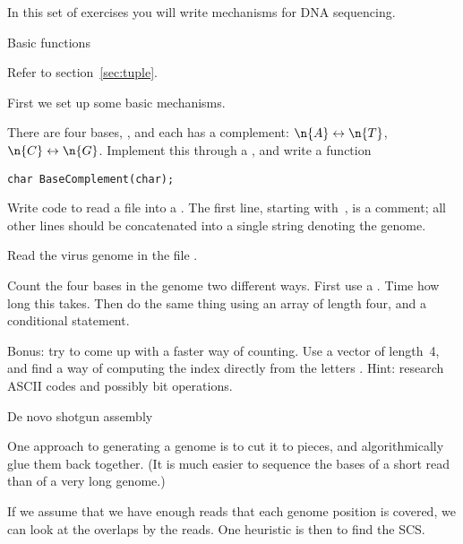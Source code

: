 
In this set of exercises you will write mechanisms for DNA sequencing.

 {Basic functions}

Refer to section~\ref{sec:tuple}.

First we set up some basic mechanisms.

\begin{exercise}
  \label{ex:basecomp}
  There are four bases, , and each has a complement:
  $\n{A}\leftrightarrow\n{T}$, $\n{C}\leftrightarrow\n{G}$.
  Implement this through a , and write a function
\begin{verbatim}
char BaseComplement(char);
\end{verbatim}
\end{exercise}

\begin{exercise}
  \label{ex:basecount}
  Write code to
  read a  file into a .
  The first line, starting with~\n{>}, is a comment; all other lines
  should be concatenated into a single string denoting the genome.
  
  Read the virus genome in the file .

  Count the four bases in the genome two different ways.  First use a
  .  Time how long this takes. Then do the same thing using an
  array of length four, and a conditional statement.

  Bonus: try to come up with a faster way of counting. Use a vector of
  length~4, and find a way of computing the index directly from the
  letters . Hint: research ASCII codes and possibly bit operations.
\end{exercise}

 {De novo shotgun assembly}

One approach to generating a genome is to cut it to pieces,
and algorithmically glue them back together.
(It is much easier to sequence the bases of a short read
than of a very long genome.)

If we assume that we have enough reads that each
genome position is covered, we can look at
the overlaps by the reads.
One heuristic is then to find the \acf{SCS}.

